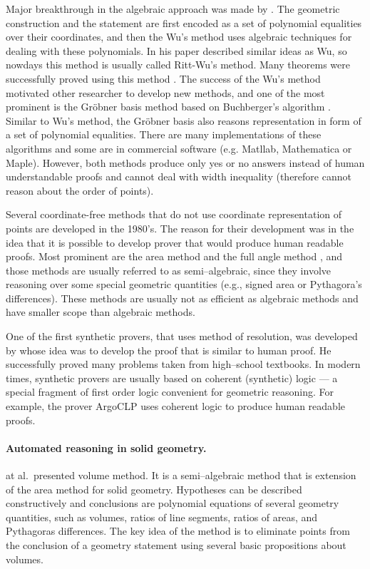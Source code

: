 \documentclass[final,1p,times,authoryear]{elsarticle}
\begin{document}
Major breakthrough in the algebraic approach was made by
\cite{wu}. The geometric construction and the statement are first
encoded as a set of polynomial equalities over their coordinates, and
then the Wu's method uses algebraic techniques for dealing with these
polynomials. In his paper \cite{ritt} described similar ideas as
Wu, so nowdays this method is usually called Ritt-Wu's method. Many
theorems were successfully proved using this method
\cite{chou1984}. The success of the Wu's method motivated other
researcher to develop new methods, and one of the most prominent is
the Gr\"obner basis method based on Buchberger's algorithm
\cite{buchberger}. Similar to Wu's method, the Gr\"obner basis also
reasons representation in form of a set of polynomial
equalities. There are many implementations of these algorithms and
some are in commercial software (e.g. Matllab, Mathematica or
Maple). However, both methods produce only yes or no answers instead
of human understandable proofs and cannot deal with width inequality
(therefore cannot reason about the order of points).

Several coordinate-free methods that do not use coordinate
representation of points are developed in the 1980's. The reason for
their development was in the idea that it is possible to develop
prover that would produce human readable proofs. Most prominent are
the area method \cite{area} and the full angle method
\cite{fullangle}, and those methods are usually referred to as
semi--algebraic, since they involve reasoning over some special
geometric quantities (e.g., signed area or Pythagora's
differences). These methods are usually not as efficient as algebraic
methods and have smaller scope than algebraic methods.

One of the first synthetic provers, that uses method of resolution,
was developed by \cite{gelertner} whose idea was to develop
the proof that is similar to human proof. He successfully proved many
problems taken from high--school textbooks. In modern times, synthetic
provers are usually based on coherent (synthetic) logic --- a special
fragment of first order logic convenient for geometric reasoning. For
example, the prover ArgoCLP \cite{sana} uses coherent logic to produce
human readable proofs.


\paragraph{Automated reasoning in solid geometry.}
\cite{volumemethod} at al.~presented volume method.  It is a
semi--algebraic method that is extension of the area method for solid
geometry. Hypotheses can be described constructively and conclusions
are polynomial equations of several geometry quantities, such as
volumes, ratios of line segments, ratios of areas, and Pythagoras
differences. The key idea of the method is to eliminate points from
the conclusion of a geometry statement using several basic
propositions about volumes.
\end{document}
